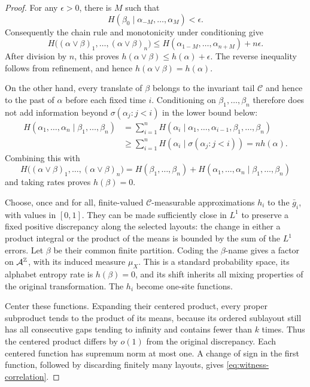 \begin{proof}
For any $\epsilon>0$, there is $M$ such that
\[
 H(\beta_0\mid\alpha_{-M},\ldots,\alpha_M)<\epsilon.
\]
Consequently the chain rule and monotonicity under conditioning give
\[
 H\bigl((\alpha\vee\beta)_1,\ldots,(\alpha\vee\beta)_n\bigr)
 \leq H(\alpha_{1-M},\ldots,\alpha_{n+M})+n\epsilon.
\]
After division by $n$, this proves
$h(\alpha\vee\beta)\leq h(\alpha)+\epsilon$.  The reverse inequality
follows from refinement, and hence
$h(\alpha\vee\beta)=h(\alpha)$.

On the other hand, every translate of $\beta$ belongs to the invariant
tail $\mathcal C$ and hence to the past of $\alpha$ before each fixed
time $i$. Conditioning on $\beta_1,\ldots,\beta_n$ therefore does not
add information beyond $\sigma(\alpha_j:j<i)$ in the lower bound below:
\begin{align*}
 H(\alpha_1,\ldots,\alpha_n\mid\beta_1,\ldots,\beta_n)
 &=\sum_{i=1}^n
 H(\alpha_i\mid\alpha_1,\ldots,\alpha_{i-1},\beta_1,\ldots,\beta_n)\\
 &\geq\sum_{i=1}^n H(\alpha_i\mid\sigma(\alpha_j:j<i))
 =n h(\alpha).
\end{align*}
Combining this with
\[
 H\bigl((\alpha\vee\beta)_1,\ldots,(\alpha\vee\beta)_n\bigr)
 =H(\beta_1,\ldots,\beta_n)
  +H(\alpha_1,\ldots,\alpha_n\mid\beta_1,\ldots,\beta_n)
\]
and taking rates proves $h(\beta)=0$.

Choose, once and for all, finite-valued $\mathcal C$-measurable
approximations $h_i$ to the $\bar g_i$, with values in $[0,1]$.  They can
be made sufficiently close in $L^1$ to preserve a fixed positive
discrepancy along the selected layouts: the change in either a product
integral or the product of the means is bounded by the sum of the
$L^1$ errors.  Let $\beta$ be their common finite partition.  Coding the
$\beta$-name gives a factor on $\mathcal A^{\mathbb Z}$, with its induced measure
$\mu_X$.  This is a standard probability space, its alphabet entropy rate
is $h(\beta)=0$, and its shift inherits all mixing properties of the
original transformation.  The $h_i$ become one-site functions.

Center these functions.  Expanding their centered product, every proper
subproduct tends to the product of its means, because its ordered
sublayout still has all consecutive gaps tending to infinity and contains
fewer than $k$ times.  Thus the centered product differs by $o(1)$ from
the original discrepancy.  Each centered function has supremum norm at
most one.  A change of sign in the first function, followed by discarding
finitely many layouts, gives \eqref{eq:witness-correlation}.
\end{proof}

